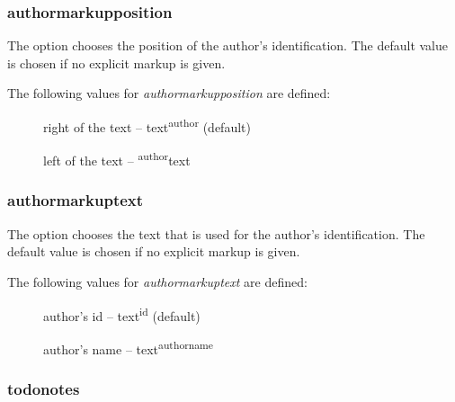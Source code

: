 

\subsubsection{authormarkupposition}


The  option chooses the position of the author's identification.
The default value is chosen if no explicit markup is given.

The following values for \emph{authormarkupposition} are defined:

\begin{description}
	\item [] right of the text -- text\textsuperscript{author} (default)
	\item [] left of the text -- \textsuperscript{author}text
\end{description}




\subsubsection{authormarkuptext}


The  option chooses the text that is used for the author's identification.
The default value is chosen if no explicit markup is given.

The following values for \emph{authormarkuptext} are defined:

\begin{description}
	\item [] author's id -- text\textsuperscript{id} (default)
	\item [] author's name -- text\textsuperscript{authorname}
\end{description}



\subsubsection{todonotes}


